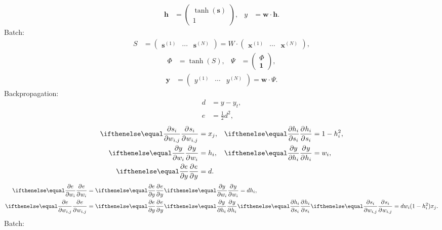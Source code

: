 \begin{align*}
    \mathbf{h} &= \begin{pmatrix} \tanh(\mathbf{s}) \\ 1 \end{pmatrix}, &
    y &= \mathbf{w}\cdot\mathbf{h}.
\end{align*}
Batch:
\begin{align*}
    S &=
        \begin{pmatrix}
            \mathbf{s}^{(1)} & \cdots & \mathbf{s}^{(N)}
        \end{pmatrix}
    = W\cdot
        \begin{pmatrix}
            \mathbf{x}^{(1)} & \cdots & \mathbf{x}^{(N)}
        \end{pmatrix},
\end{align*}
\begin{align*}
    \Phi &= \tanh(S), &
    \Psi &= \begin{pmatrix}
        \Phi \\ \mathbf{1}
    \end{pmatrix},
\end{align*}
\begin{align*}
    \mathbf{y} &=
        \begin{pmatrix}
            y^{(1)} & \cdots & y^{(N)}
        \end{pmatrix}
    = \mathbf{w}\cdot\Psi.
\end{align*}
Backpropagation:
\begin{align*}
    d &= y - y_t,\\
    e &= \frac{1}{2}d^2,
\end{align*}
\begin{align*}
    \Rpdiff{s_i}{w_{i,j}} &= x_j, &
    \Rpdiff{h_i}{s_i} &= 1 - h_i^2,\\
    \Rpdiff{y}{w_i} &= h_i, &
    \Rpdiff{y}{h_i} &= w_i,\\
    \Rpdiff{e}{y} &= d.
\end{align*}
\begin{align*}
    \Rpdiff{e}{w_i}
    &= \Rpdiff{e}{y}\Rpdiff{y}{w_i}
    = dh_i,\\
    \Rpdiff{e}{w_{i,j}}
    &= \Rpdiff{e}{y}\Rpdiff{y}{h_i}\Rpdiff{h_i}{s_i}\Rpdiff{s_i}{w_{i,j}}
    = d w_i (1 - h_i^2) x_j.
\end{align*}
Batch:
